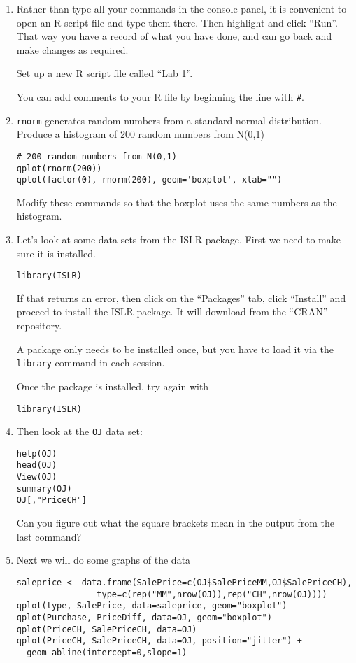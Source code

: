 \documentclass[11pt]{article}
\begin{document}
\begin{enumerate}
\item Rather than type all your commands in the console panel, it is convenient to open an R script file and type them there. Then highlight and click ``Run''. That way you have a record of what you have done, and can go back and make changes as required.

Set up a new R script file called ``Lab 1''.

You can add comments to your R file by beginning the line with \verb|#|.

\item \verb|rnorm| generates random numbers from a standard normal distribution. 
Produce a histogram of 200 random numbers from N(0,1)
\begin{verbatim}
# 200 random numbers from N(0,1)
qplot(rnorm(200)) 
qplot(factor(0), rnorm(200), geom='boxplot', xlab="")
\end{verbatim}
Modify these commands so that the boxplot uses the same numbers as the histogram.

\item  Let's look at some data sets from the ISLR package. First we need to make sure it is installed.
\begin{verbatim}
library(ISLR)
\end{verbatim}
If that returns an error, then click on the ``Packages'' tab, click ``Install'' and proceed to install the ISLR package. It will download from the ``CRAN'' repository.

A package only needs to be installed once, but you have to load it via the \verb|library| command in each session.

Once the package is installed, try again with 
\begin{verbatim}
library(ISLR)
\end{verbatim}

\item Then look at the \verb|OJ| data set:
\begin{verbatim}
help(OJ)
head(OJ)
View(OJ)
summary(OJ)
OJ[,"PriceCH"]
\end{verbatim}

Can you figure out what the square brackets mean in the output from the last command?

\item Next we will do some graphs of the data
\begin{verbatim}
saleprice <- data.frame(SalePrice=c(OJ$SalePriceMM,OJ$SalePriceCH),
                type=c(rep("MM",nrow(OJ)),rep("CH",nrow(OJ))))
qplot(type, SalePrice, data=saleprice, geom="boxplot")
qplot(Purchase, PriceDiff, data=OJ, geom="boxplot")
qplot(PriceCH, SalePriceCH, data=OJ)
qplot(PriceCH, SalePriceCH, data=OJ, position="jitter") + 
  geom_abline(intercept=0,slope=1)


\end{verbatim}
\end{enumerate}
\end{document}
